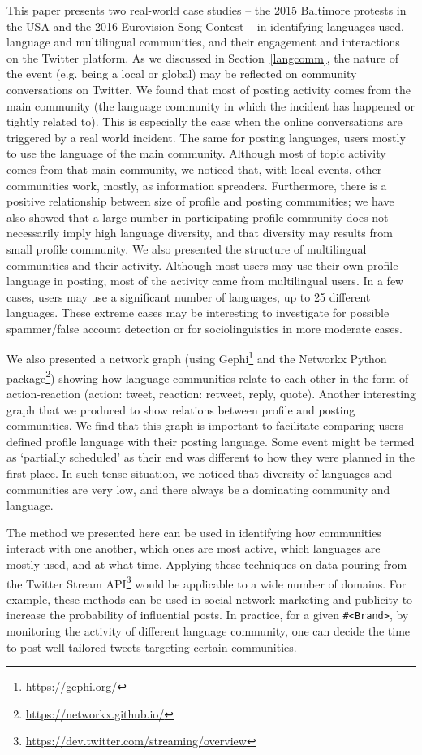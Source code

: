 This paper presents two real-world case studies -- the 2015 Baltimore
protests in the USA and the 2016 Eurovision Song Contest -- in
identifying languages used, language and multilingual communities, and
their engagement and interactions on the Twitter platform. As we
discussed in Section~\ref{langcomm}, the nature of the event
(e.g. being a local or global) may be reflected on community
conversations on Twitter. We found that most of posting activity comes
from the main community (the language community in which the incident
has happened or tightly related to). This is especially the case when
the online conversations are triggered by a real world incident. The
same for posting languages, users mostly to use the language of the
main community. Although most of topic activity comes from that main
community, we noticed that, with local events, other communities work,
mostly, as information spreaders. Furthermore, there is a positive
relationship between size of profile and posting communities; we have
also showed that a large number in participating profile community
does not necessarily imply high language diversity, and that diversity
may results from small profile community. We also presented the
structure of multilingual communities and their activity. Although
most users may use their own profile language in posting, most of the
activity came from multilingual users. In a few cases, users may use a
significant number of languages, up to 25 different languages. These
extreme cases may be interesting to investigate for possible
spammer/false account detection or for sociolinguistics in more
moderate cases.

We also presented a network graph (using
Gephi\footnote{\url{https://gephi.org/}} and the Networkx Python
package\footnote{\url{https://networkx.github.io/}}) showing how
language communities relate to each other in the form of
action-reaction (action: tweet, reaction: retweet, reply,
quote). Another interesting graph that we produced to show relations
between profile and posting communities. We find that this graph is
important to facilitate comparing users defined profile language with
their posting language. Some event might be termed as `partially
scheduled' as their end was different to how they were planned in the
first place. In such tense situation, we noticed that diversity of
languages and communities are very low, and there always be a
dominating community and language.

The method we presented here can be used in identifying how
communities interact with one another, which ones are most active,
which languages are mostly used, and at what time. Applying these
techniques on data pouring from the Twitter Stream
API\footnote{\url{https://dev.twitter.com/streaming/overview}} would
be applicable to a wide number of domains. For example, these methods
can be used in social network marketing and publicity to increase the
probability of influential posts. In practice, for a given
{\texttt{\#<Brand>}}, by monitoring the activity of different language
community, one can decide the time to post well-tailored tweets
targeting certain communities.

